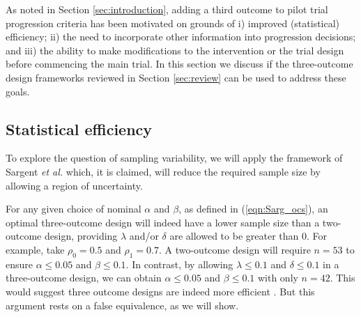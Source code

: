 \documentclass[sagev]{sagej} %
\begin{document}
As noted in Section \ref{sec:introduction}, adding a third outcome to pilot trial progression criteria has been motivated on grounds of i) improved (statistical) efficiency; ii) the need to incorporate other information into progression decisions; and iii) the ability to make modifications to the intervention or the trial design before commencing the main trial. In this section we discuss if the three-outcome design frameworks reviewed in Section \ref{sec:review} can be used to address these goals.

\subsection{Statistical efficiency}\label{sec:efficiency}

To explore the question of sampling variability, we will apply the framework of Sargent \emph{et al.} \cite{Sargent2001} which, it is claimed, will reduce the required sample size by allowing a region of uncertainty.

For any given choice of nominal $\alpha$ and $\beta$, as defined in (\ref{eqn:Sarg_ocs}), an optimal three-outcome design will indeed have a lower sample size than a two-outcome design, providing $\lambda$ and/or $\delta$ are allowed to be greater than 0. For example, take $\rho_0 = 0.5$ and $\rho_1 = 0.7$. A two-outcome design will require $n = 53$ to ensure $\alpha \leq 0.05$ and $\beta \leq 0.1$. In contrast, by allowing $\lambda \leq 0.1$ and $\delta \leq 0.1$ in a three-outcome design, we can obtain $\alpha \leq 0.05$ and $\beta \leq 0.1$ with only $n = 42$. This would suggest three outcome designs are indeed more efficient \cite{Sargent2001, Hong2007}. But this argument rests on a false equivalence, as we will show.
\end{document}
